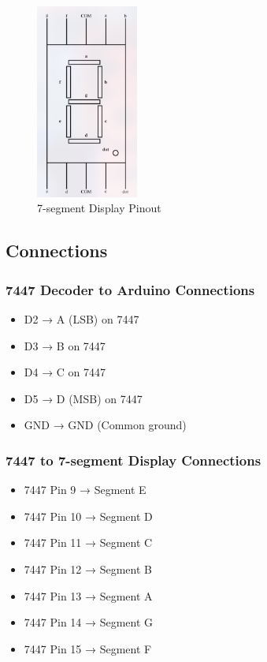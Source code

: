 \documentclass{article}
\begin{document}
\begin{figure}[H]
    \centering
    \includegraphics[width=0.3\textwidth]{figs/7seg_pinout.jpg}
    \caption{7-segment Display Pinout}
\end{figure}

\subsection{Connections}

\subsubsection{7447 Decoder to Arduino Connections}
\begin{itemize}
    \item D2 → A (LSB) on 7447
    \item D3 → B on 7447
    \item D4 → C on 7447
    \item D5 → D (MSB) on 7447
    \item GND → GND (Common ground)
\end{itemize}

\subsubsection{7447 to 7-segment Display Connections}
\begin{itemize}
    \item 7447 Pin 9 → Segment E
    \item 7447 Pin 10 → Segment D
    \item 7447 Pin 11 → Segment C
    \item 7447 Pin 12 → Segment B
    \item 7447 Pin 13 → Segment A
    \item 7447 Pin 14 → Segment G
    \item 7447 Pin 15 → Segment F
\end{itemize}
\end{document}
